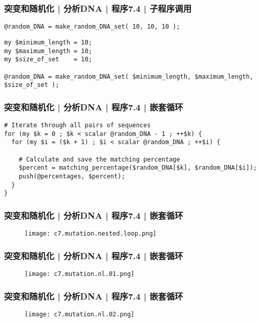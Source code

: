 \begin{frame}[fragile]
  \frametitle{突变和随机化 | 分析DNA | 程序7.4 | 子程序调用}
\begin{lstlisting}
@random_DNA = make_random_DNA_set( 10, 10, 10 );
\end{lstlisting}
\pause
\begin{lstlisting}
my $minimum_length = 10;
my $maximum_length = 10;
my $size_of_set    = 10;

@random_DNA = make_random_DNA_set( $minimum_length, $maximum_length, $size_of_set );
\end{lstlisting}
\end{frame}

\begin{frame}[fragile]
  \frametitle{突变和随机化 | 分析DNA | 程序7.4 | \alert{嵌套循环}}
\begin{lstlisting}
# Iterate through all pairs of sequences
for (my $k = 0 ; $k < scalar @random_DNA - 1 ; ++$k) {
  for (my $i = ($k + 1) ; $i < scalar @random_DNA ; ++$i) {

    # Calculate and save the matching percentage
    $percent = matching_percentage($random_DNA[$k], $random_DNA[$i]);
    push(@percentages, $percent);
  }
}
\end{lstlisting}
\end{frame}

\begin{frame}
  \frametitle{突变和随机化 | 分析DNA | 程序7.4 | 嵌套循环}
  \begin{figure}
    \centering
    \texttt{[image: c7.mutation.nested.loop.png]}
  \end{figure}
\end{frame}

\begin{frame}
  \frametitle{突变和随机化 | 分析DNA | 程序7.4 | 嵌套循环}
  \begin{figure}
    \centering
    \texttt{[image: c7.mutation.nl.01.png]}
  \end{figure}
\end{frame}

\begin{frame}
  \frametitle{突变和随机化 | 分析DNA | 程序7.4 | 嵌套循环}
  \begin{figure}
    \centering
    \texttt{[image: c7.mutation.nl.02.png]}
  \end{figure}
\end{frame}

